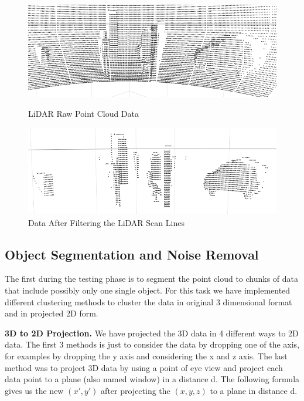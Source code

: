 \begin{figure}[!h]
\centering
\begin{minipage}{0.49\textwidth}
  \centering
        \includegraphics[width=.9\linewidth]{images/ground_before2.png}
        \caption{LiDAR Raw Point Cloud Data}
        \label{fig:ground_before}
\end{minipage}%
\begin{minipage}{0.49\textwidth}
  \centering
        \includegraphics[width=.9\linewidth]{images/ground_after2.png}
        \caption{Data After Filtering the LiDAR Scan Lines}
        \label{fig:after}
\end{minipage}%
\end{figure}





\subsection{Object Segmentation and Noise Removal}
The first during the testing phase is to segment the point cloud to chunks of data that include possibly only one single object.
For this task we have implemented different clustering methods to cluster the data in original 3 dimensional format and in projected 2D form.      



\textbf{3D to 2D Projection.} We have projected the 3D data in 4 different ways to 2D data. The first 3 methods is just to consider the data by dropping one of the axis, for examples by dropping the y axis and considering the x and z axis.  The last method was to project 3D data by using a point of eye view and project each data point to a plane (also named window) in a distance d.  The following formula gives us the new $(x',  y')$ after projecting the $(x,y,z)$ to a plane in distance d. 

